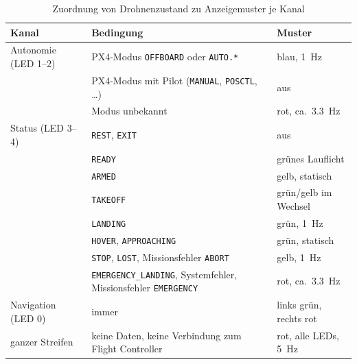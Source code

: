             \begin{table}[H]
                \centering
                \caption{Zuordnung von Drohnenzustand zu Anzeigemuster je Kanal}
                \label{tab:LED_Zuordnung}
                \begin{tabularx}{\textwidth}{l X l}
                    \toprule
                    \textbf{Kanal} & \textbf{Bedingung} & \textbf{Muster} \\
                    \midrule
                    Autonomie (LED 1--2) & PX4-Modus \texttt{OFFBOARD} oder \texttt{AUTO.*} & blau, \SI{1}{\hertz} \\
                                         & PX4-Modus mit Pilot (\texttt{MANUAL}, \texttt{POSCTL}, \dots) & aus \\
                                         & Modus unbekannt & rot, ca.\ \SI{3,3}{\hertz} \\
                    \midrule
                    Status (LED 3--4)    & \texttt{REST}, \texttt{EXIT} & aus \\
                                         & \texttt{READY} & grünes Lauflicht \\
                                         & \texttt{ARMED} & gelb, statisch \\
                                         & \texttt{TAKEOFF} & grün/gelb im Wechsel \\
                                         & \texttt{LANDING} & grün, \SI{1}{\hertz} \\
                                         & \texttt{HOVER}, \texttt{APPROACHING} & grün, statisch \\
                                         & \texttt{STOP}, \texttt{LOST}, Missionsfehler \texttt{ABORT} & gelb, \SI{1}{\hertz} \\
                                         & \texttt{EMERGENCY\_LANDING}, Systemfehler, Missionsfehler \texttt{EMERGENCY} & rot, ca.\ \SI{3,3}{\hertz} \\
                    \midrule
                    Navigation (LED 0)   & immer & links grün, rechts rot \\
                    \midrule
                    ganzer Streifen      & keine Daten, keine Verbindung zum Flight Controller & rot, alle LEDs, \SI{5}{\hertz} \\
                    \bottomrule
                \end{tabularx}
            \end{table}

